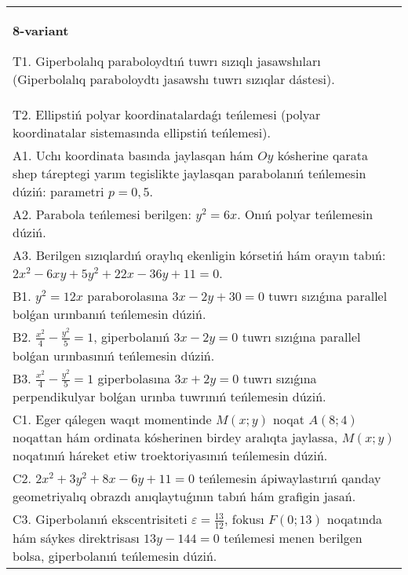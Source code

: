 \documentclass{article}
\begin{document}
\begin{tabular}{m{17cm}}
\textbf{8-variant}
\newline

T1. Giperbolalıq paraboloydtıń tuwrı sızıqlı jasawshıları (Giperbolalıq paraboloydtı jasawshı tuwrı sızıqlar dástesi).\\

T2. Ellipstiń polyar koordinatalardaǵı teńlemesi (polyar koordinatalar sistemasında ellipstiń teńlemesi).\\

A1. Uchı koordinata basında jaylasqan hám $Oy$ kósherine qarata shep táreptegi yarım tegislikte jaylasqan parabolanıń teńlemesin dúziń: parametri $p=0,5$.\\

A2. Parabola teńlemesi berilgen: $y^2=6 x$. Onıń polyar teńlemesin dúziń.\\

A3. Berilgen sızıqlardıń oraylıq ekenligin kórsetiń hám orayın tabıń: $2 x^{2}-6 xy+5 y^{2}+22 x-36 y+11=0$.\\

B1. $y^{2} = 12x$ paraborolasına $3x - 2y + 30 = 0$ tuwrı sızıǵına parallel bolǵan urınbanıń teńlemesin dúziń.  \\

B2. $\frac{x^{2}}{4} - \frac{y^{2}}{5} = 1$, giperbolanıń $3x - 2y = 0$ tuwrı sızıǵına parallel bolǵan urınbasınıń teńlemesin dúziń.  \\

B3. $\frac{x^{2}}{4} - \frac{y^{2}}{5} = 1$ giperbolasına $3x + 2y = 0$ tuwrı sızıǵına perpendikulyar bolǵan urınba tuwrınıń teńlemesin dúziń.\\

C1. Eger qálegen waqıt momentinde $M(x;y)$ noqat $A(8;4)$ noqattan hám ordinata kósherinen birdey aralıqta jaylassa, $M(x;y)$ noqatınıń háreket etiw troektoriyasınıń teńlemesin dúziń.  \\

C2. $2x^{2} + 3y^{2} + 8x - 6y + 11 = 0$ teńlemesin ápiwaylastırıń qanday geometriyalıq obrazdı anıqlaytuǵının tabıń hám grafigin jasań.\\

C3. Giperbolanıń ekscentrisiteti $\varepsilon = \frac{13}{12}$, fokusı $F(0;13)$ noqatında hám sáykes direktrisası $13y - 144 = 0$ teńlemesi menen berilgen bolsa, giperbolanıń teńlemesin dúziń.  \\

\end{tabular}
\vspace{1cm}
\end{document}
